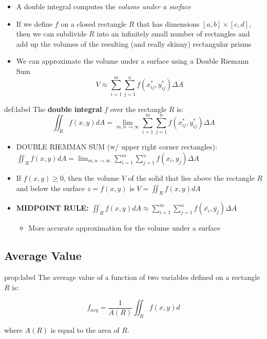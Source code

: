 \documentclass{package/notes}
\begin{document}
\begin{itemize}
	\item A double integral computes the \textit{volume under a surface}
	\item If we define $f$ on a closed rectangle $R$ that has dimensions $[a,b]\times[c,d]$, then we can subdivide $R$ into an infinitely small number of rectangles and add up the volumes of the resulting (and really skinny) rectangular prisms
	\item We can approximate the volume under a surface using a Double Riemann Sum $$V \approx \sum_{i=1}^{m}\sum_{j=1}^{n} f(x_{ij}^*, y_{ij}^*)\Delta A$$
\end{itemize}

\begin{definition}{def:label}
	The \textbf{double integral} $f$ over the rectangle $R$ is:
	$$\iint_Rf(x,y)dA = \lim_{m,n\to\infty}\sum_{i=1}^{m}\sum_{j=1}^{n} f(x_{ij}^*, y_{ij}^*)\Delta A$$
\end{definition}

\begin{itemize}
	\item DOUBLE RIEMMAN SUM (w/ upper right corner rectangles): $\iint_Rf(x,y)dA = \lim_{m,n\to\infty}\sum_{i=1}^{m}\sum_{j=1}^{n} f(x_{i}, y_{j})\Delta A$
	\item If $f(x,y) \ge 0$, then the volume $V$ of the solid that lies above the rectangle $R$ and below the surface $z=f(x,y)$ is $V = \iint_R f(x,y) dA$ 
	\item \textbf{MIDPOINT RULE:} $\iint_Rf(x,y)dA \approx \sum_{i=1}^{m}\sum_{j=1}^{n} f(\bar{x_i},\bar{y_j})\Delta A$
	\begin{itemize}
		\item More accurate approximation for the volume under a surface
	\end{itemize}
\end{itemize}


\subsection{Average Value}

\begin{proposition}{prop:label}
	The average value of a function of two variables defined on a rectangle $R$ is:

	$$f_{avg}=\frac{1}{A(R)}\iint_Rf(x,y)d$$

	where $A(R)$ is equal to the area of $R$.
\end{proposition}
\end{document}

